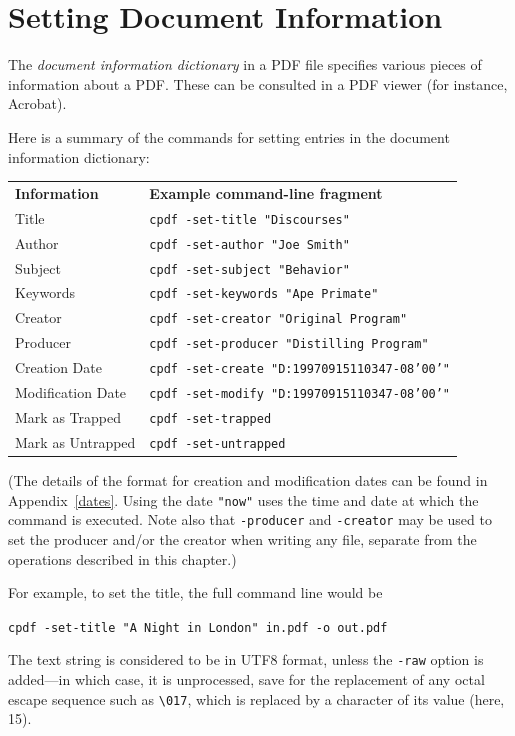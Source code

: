 \documentclass{book}
\begin{document}
\section{Setting Document Information}
\label{setdocinfo}
  The \textit{document information dictionary} in a PDF file specifies various
pieces of information about a PDF. These can be consulted in a PDF viewer (for
instance, Acrobat).

  Here is a summary of the commands for setting entries in the document
information dictionary:

{\small\begin{framed}
    \noindent\begin{tabular}{ll}
       \textbf{Information} & \textbf{Example command-line fragment} \\
       Title & \texttt{cpdf -set-title "Discourses"} \\
       Author & \texttt{cpdf -set-author "Joe Smith"} \\
       Subject & \texttt{cpdf -set-subject "Behavior"} \\
       Keywords & \texttt{cpdf -set-keywords "Ape Primate"} \\
       Creator & \texttt{cpdf -set-creator "Original Program"} \\
       Producer & \texttt{cpdf -set-producer "Distilling Program"} \\
       Creation Date & \texttt{cpdf -set-create "D:19970915110347-08'00'"} \\
       Modification Date & \texttt{cpdf -set-modify "D:19970915110347-08'00'"} \\
       Mark as Trapped & \texttt{cpdf -set-trapped} \\
       Mark as Untrapped & \texttt{cpdf -set-untrapped} \\
    \end{tabular}
\end{framed}}

  \noindent (The details of the format for creation and modification dates can be found
in Appendix~\ref{dates}. Using the date \texttt{"now"} uses the time and date
at which the command is executed. Note also that \texttt{-producer} and \texttt{-creator} may be used to set the producer and/or the creator when writing any file, separate from the operations described in this chapter.)
  
  \vspace{2mm}
  For example, to set the title, the full command line would be
  \begin{framed}
    \noindent\small\verb!cpdf -set-title "A Night in London" in.pdf -o out.pdf!
  \end{framed}
\noindent The text string is considered to be in UTF8 format, unless the \texttt{-raw}
option is added---in which case, it is unprocessed, save for the replacement of any octal escape sequence such as \texttt{\textbackslash 017}, which is replaced by a character of its value (here, 15).
\end{document}
